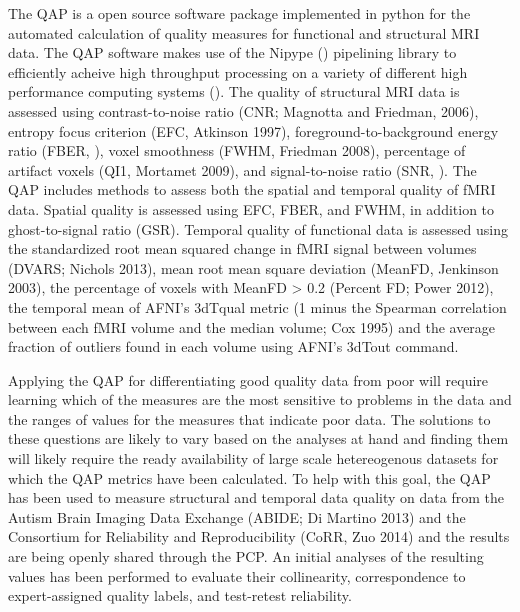 \documentclass{frontiersSCNS} %
\begin{document}
The QAP is a open source software package implemented in python for the automated calculation of quality measures for functional and structural MRI data. The QAP software makes use of the Nipype () pipelining library to efficiently acheive high throughput processing on a variety of different high performance computing systems (). The quality of structural MRI data is assessed using contrast-­to-­noise ratio (CNR; Magnotta and Friedman, 2006), entropy focus criterion (EFC, Atkinson 1997), foreground-­to-­background energy ratio (FBER, ), voxel smoothness (FWHM, Friedman 2008), percentage of artifact voxels (QI1, Mortamet 2009), and signal­-to-­noise ratio (SNR, \cite{magnotta2006}). The QAP includes methods to assess both the spatial and temporal quality of fMRI data. Spatial quality is assessed using EFC, FBER, and FWHM, in addition to ghost-­to-­signal ratio (GSR). Temporal quality of functional data is assessed using the standardized root mean squared change in fMRI signal between volumes (DVARS; Nichols 2013), mean root mean square deviation (MeanFD, Jenkinson 2003), the percentage of voxels with MeanFD > 0.2 (Percent FD; Power 2012), the temporal mean of AFNI’s 3dTqual metric (1 minus the Spearman correlation between each fMRI volume and the median volume; Cox 1995) and the average fraction of outliers found in each volume using AFNI’s 3dTout command.

Applying the QAP for differentiating good quality data from poor will require learning which of the measures are the most sensitive to problems in the data and the ranges of values for the measures that indicate poor data. The solutions to these questions are likely to vary based on the analyses at hand and finding them will likely require the ready availability of large scale hetereogenous datasets for which the QAP metrics have been calculated. To help with this goal, the QAP has been used to measure structural and temporal data quality on data from the Autism Brain Imaging Data Exchange (ABIDE; Di Martino 2013) and the Consortium for Reliability and Reproducibility (CoRR, Zuo 2014) and the results are being openly shared through the PCP. An initial analyses of the resulting values has been performed to evaluate their collinearity, correspondence to expert­-assigned quality labels, and test­-retest reliability.
\end{document}

